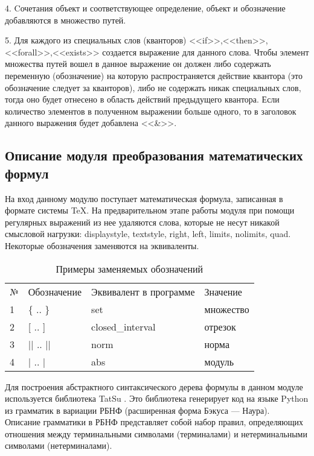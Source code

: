 \documentclass[12pt]{article}
\begin{document}
4. Cочетания объект и соответствующее определение, объект и обозначение добавляются в множество путей. 

5. Для каждого из специальных слов (кванторов) <<if>>,<<then>>,<<forall>>,<<exists>> создается выражение для данного слова. Чтобы элемент множества путей вошел в данное выражение он должен либо содержать переменную (обозначение) на которую распространяется действие квантора (это обозначение следует за кванторов), либо не содержать никак специальных слов, тогда оно будет отнесено в область действий предыдущего квантора. Если количество элементов в полученном выражении больше одного, то в заголовок данного выражения будет добавлена <<\&>>.

\subsection{Описание модуля преобразования математических формул}
На вход данному модулю поступает математическая формула, записанная в формате системы TeX. На предварительном этапе работы модуля при помощи регулярных выражений из нее удаляются слова, которые не несут никакой смысловой нагрузки:
displaystyle, textstyle, right, left, limits, nolimits, quad. Некоторые обозначения заменяются на эквиваленты.

\begin{table}[h!]
\begin{tabular}{ l l l l}
№ & Обозначение & Эквивалент в программе & Значение  \\
1 & \{ .. \} & set  & множество\\
2 & [ .. ] & closed\_interval  & отрезок \\
3 & || .. || & norm & норма \\
4 & | .. | & abs & модуль \\

\end{tabular}
\label{table:satellites}
  \caption{Примеры заменяемых обозначений}
\end{table} 

Для построения абстрактного синтаксического дерева формулы в данном модуле используется библиотека TatSu . Это библиотека генерирует код на языке Python из грамматик в вариации РБНФ (расширенная форма Бэкуса — Наура).\\

Описание грамматики в РБНФ представляет собой набор правил, определяющих отношения между терминальными символами (терминалами) и нетерминальными символами (нетерминалами).\\
\end{document}
